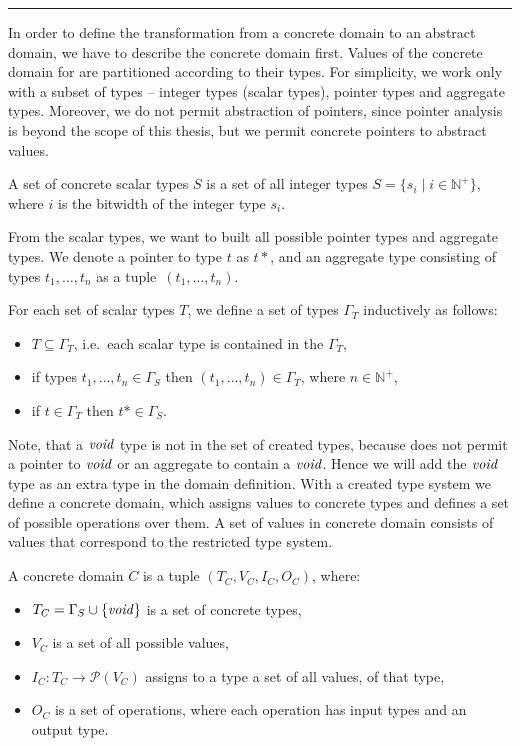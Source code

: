 \hrule

\bigskip

In order to define the transformation from a concrete domain to an abstract
domain, we have to describe the concrete domain first. Values of the concrete
domain for \LLVM are partitioned according to their types. For simplicity, we
work only with a subset of \LLVM types -- integer types (scalar types), pointer
types and aggregate types. Moreover, we do not permit abstraction of pointers,
since pointer analysis is beyond the scope of this thesis, but we permit
concrete pointers to abstract values.
\begin{definition}
A set of concrete scalar types $S$ is a set of all integer types $S = \{
s_i \mid i \in \mathbb{N}^+ \}$, where $i$ is the bitwidth of the integer type
$s_i$.
\end{definition}
From the scalar types, we want to built all possible pointer types and
aggregate types. We denote a pointer to type $t$ as $t*$, and an aggregate type
consisting of types $t_1, \dots, t_n$ as a tuple~$(t_1, \dots, t_n)$.

\begin{definition}
    For each set of scalar types $T$, we define a set of types $\Gamma_T$
    inductively as follows:
    \begin{itemize}
        \item $T \subseteq \Gamma_T$, i.e.~each scalar type is contained in the
            $\Gamma_T$,
        \item if types $t_1, \dots, t_n \in \Gamma_S$ then
            $(t_1, \dots, t_n) \in \Gamma_T$, where $n \in \mathbb{N}^+$,
        \item if $t \in \Gamma_T$ then $t* \in \Gamma_S$.
    \end{itemize}
\end{definition}
Note, that a $\mathit{void}$ type is not in the set of created types, because \LLVM does
not permit a pointer to $\mathit{void}$ or an aggregate to contain a $\mathit{void}$. Hence we
will add the $\mathit{void}$ type as an extra type in the domain definition. With a
created type system we define a concrete domain, which assigns values to
concrete types and defines a set of possible operations over them. A set of
values in concrete domain consists of \LLVM values that correspond to the
restricted type system.
\begin{definition}
    A concrete domain $C$ is a tuple $(T_C, V_C, I_C, O_C)$, where:
    \begin{itemize}
        \item $T_C = \Gamma_S \cup \{ \mathit{void} \}$ is a set of concrete types,
        \item $V_C$ is a set of all possible \LLVM values,
        \item $I_C \colon T_C \to \mathcal{P}(V_C)$ assigns to a type a set of
            all values, of that type,
        \item $O_C$ is a set of \LLVM operations, where each operation has
            input types and an output type.
    \end{itemize}
\end{definition}

